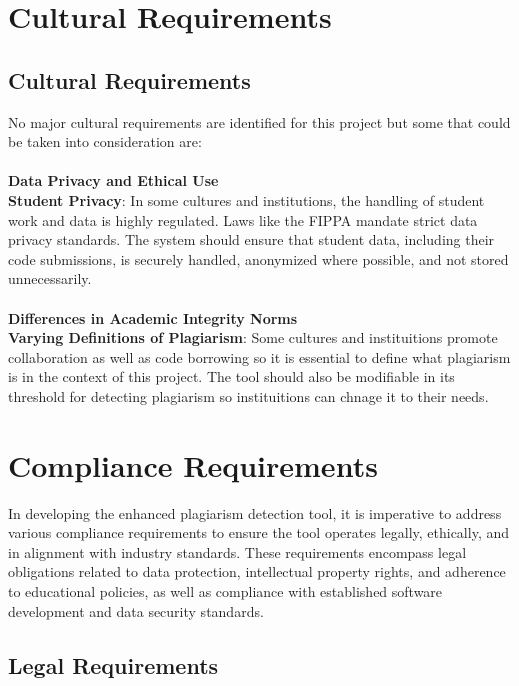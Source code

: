 \documentclass[12pt]{article}
\begin{document}
\section{Cultural Requirements}
\subsection{Cultural Requirements}
No major cultural requirements are identified for this project but some that could be taken into consideration are:\\ \\ 
\noindent \textbf{Data Privacy and Ethical Use}\\ 
\textbf{Student Privacy}: In some cultures and institutions, the handling of student work and data is highly regulated. Laws like the FIPPA mandate strict data privacy standards. The system should ensure that student data, including their code submissions, is securely handled, anonymized where possible, and not stored unnecessarily.
\\ \\
\noindent \textbf{Differences in Academic Integrity Norms}\\ 
\textbf{Varying Definitions of Plagiarism}: Some cultures and instituitions promote collaboration as well as code borrowing so it is essential to define what plagiarism is in the context of this project. The tool should also be modifiable in its threshold for detecting plagiarism so instituitions can chnage it to their needs.


\section{Compliance Requirements}

In developing the enhanced plagiarism detection tool, it is imperative to address
various compliance requirements to ensure the tool operates legally, ethically,
and in alignment with industry standards. These requirements encompass legal
obligations related to data protection, intellectual property rights, and
adherence to educational policies, as well as compliance with established software
development and data security standards.

\subsection{Legal Requirements}
\end{document}
